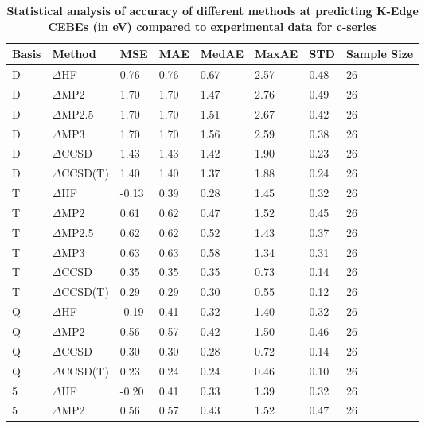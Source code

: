 \begin{table}
  \caption{\textbf{Statistical analysis of accuracy of different methods at predicting K-Edge CEBEs (in eV) compared to experimental data for c-series}}
  \label{tbl:summary-c}
  \begin{tabular}{l l l l l l l l }
    \hline
    \textbf{Basis} & \textbf{Method} & \textbf{MSE} & \textbf{MAE} & \textbf{MedAE} & \textbf{MaxAE} & \textbf{STD} & \textbf{Sample Size} \\ 
    \hline
    D & $\Delta$HF & 0.76 & 0.76 & 0.67 & 2.57 & 0.48 & 26 \\ 
    D & $\Delta$MP2 & 1.70 & 1.70 & 1.47 & 2.76 & 0.49 & 26 \\ 
    D & $\Delta$MP2.5 & 1.70 & 1.70 & 1.51 & 2.67 & 0.42 & 26 \\ 
    D & $\Delta$MP3 & 1.70 & 1.70 & 1.56 & 2.59 & 0.38 & 26 \\ 
    D & $\Delta$CCSD & 1.43 & 1.43 & 1.42 & 1.90 & 0.23 & 26 \\ 
    D & $\Delta$CCSD(T) & 1.40 & 1.40 & 1.37 & 1.88 & 0.24 & 26 \\ 
    T & $\Delta$HF & -0.13 & 0.39 & 0.28 & 1.45 & 0.32 & 26 \\ 
    T & $\Delta$MP2 & 0.61 & 0.62 & 0.47 & 1.52 & 0.45 & 26 \\ 
    T & $\Delta$MP2.5 & 0.62 & 0.62 & 0.52 & 1.43 & 0.37 & 26 \\ 
    T & $\Delta$MP3 & 0.63 & 0.63 & 0.58 & 1.34 & 0.31 & 26 \\ 
    T & $\Delta$CCSD & 0.35 & 0.35 & 0.35 & 0.73 & 0.14 & 26 \\ 
    T & $\Delta$CCSD(T) & 0.29 & 0.29 & 0.30 & 0.55 & 0.12 & 26 \\ 
    Q & $\Delta$HF & -0.19 & 0.41 & 0.32 & 1.40 & 0.32 & 26 \\ 
    Q & $\Delta$MP2 & 0.56 & 0.57 & 0.42 & 1.50 & 0.46 & 26 \\ 
    Q & $\Delta$CCSD & 0.30 & 0.30 & 0.28 & 0.72 & 0.14 & 26 \\ 
    Q & $\Delta$CCSD(T) & 0.23 & 0.24 & 0.24 & 0.46 & 0.10 & 26 \\ 
    5 & $\Delta$HF & -0.20 & 0.41 & 0.33 & 1.39 & 0.32 & 26 \\ 
    5 & $\Delta$MP2 & 0.56 & 0.57 & 0.43 & 1.52 & 0.47 & 26 \\ 
    \hline
  \end{tabular}
\end{table}
